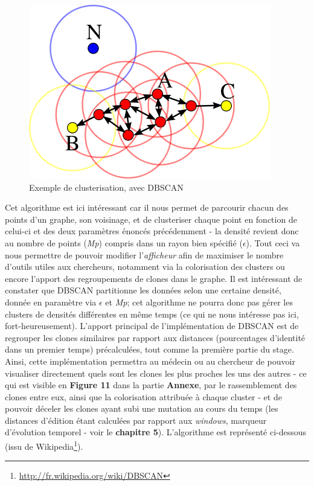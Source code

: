 \documentclass[pdftex,12pt,a4paper]{report}
\begin{document}
\begin{spacing}{1.2}
\begin{figure}[H]
\begin{center}
	\includegraphics[scale=0.45]{img/400px-DBSCAN-Illustration.png}
\end{center}
\caption{Exemple de clusterisation, avec DBSCAN}
\end{figure}

Cet algorithme est ici intéressant car il nous permet de parcourir chacun des points d'un graphe, son voisinage, et de clusteriser chaque point en fonction de celui-ci et des deux paramètres énoncés précédemment - la densité revient donc au nombre de points (\textit{Mp}) compris dans un rayon bien spécifié ($\epsilon$). Tout ceci va nous permettre de pouvoir modifier l'\textit{afficheur} afin de maximiser le nombre d'outils utiles aux chercheurs, notamment via la colorisation des clusters ou encore l'apport des regroupements de clones dans le graphe.
\newline
Il est intéressant de constater que DBSCAN partitionne les données selon une certaine densité, donnée en paramètre via $\epsilon$ et \textit{Mp}; cet algorithme ne pourra donc pas gérer les clusters de densités différentes en même temps (ce qui ne nous intéresse pas ici, fort-heureusement).
\newline
L'apport principal de l'implémentation de DBSCAN est de regrouper les clones similaires par rapport aux distances (pourcentages d'identité dans un premier temps) précalculées, tout comme la première partie du stage.
Ainsi, cette implémentation permettra au médecin ou au chercheur de pouvoir visualiser directement quels sont les clones les plus proches les uns des autres - ce qui est visible en \textbf{Figure 11} dans la partie \textbf{Annexe}, par le rassemblement des clones entre eux, ainsi que la colorisation attribuée à chaque cluster - et de pouvoir déceler les clones ayant subi une mutation au cours du temps (les distances d'édition étant calculées par rapport aux \textit{windows}, marqueur d'évolution temporel - voir le \textbf{chapitre 5}).
\newline
L'algorithme est représenté ci-dessous (issu de Wikipedia\footnote{\url{http://fr.wikipedia.org/wiki/DBSCAN}}).


\end{spacing}
\end{document}
